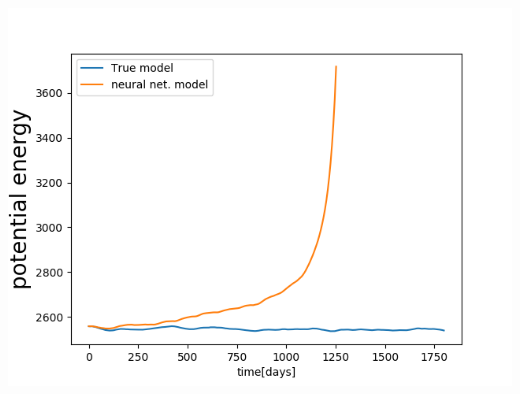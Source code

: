 \documentclass[handout]{beamer}
\begin{document}
\begin{frame}
\begin{columns}
\includegraphics[width=\textwidth]{./fig/L3/evolnw-EP.png}
\end{columns}
\end{frame}
\end{document}
